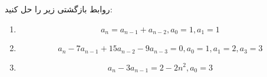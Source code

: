 \EXERCISE
روابط بازگشتی زیر را حل کنید:
\begin{enumerate}
\item
$$a_n = a_{n-1} + a_{n-2}, a_0 = 1, a_1 = 1$$
\item
$$a_n - 7a_{n-1} + 15a_{n-2} - 9a_{n-3} = 0, a_0 = 1, a_1 = 2, a_3 = 3$$
\item
$$a_n - 3a_{n-1} = 2 - 2n^2, a_0 = 3$$
\end{enumerate}